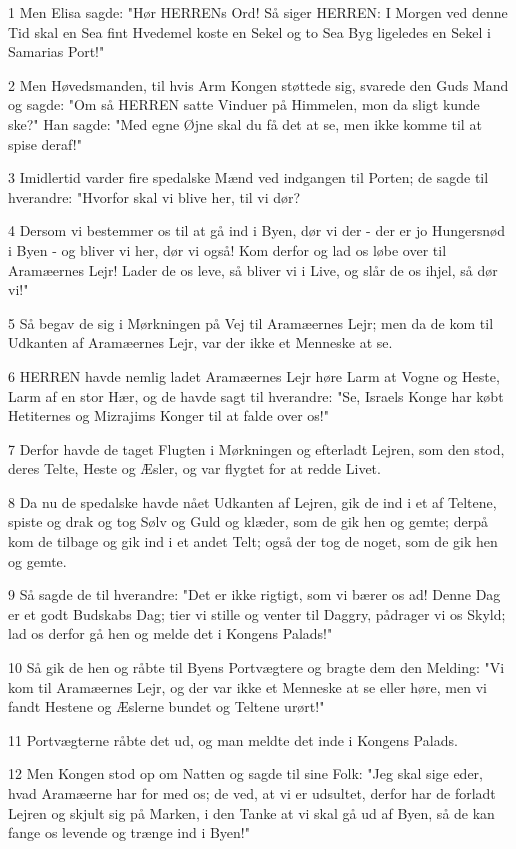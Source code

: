 \par 1 Men Elisa sagde: "Hør HERRENs Ord! Så siger HERREN: I Morgen ved denne Tid skal en Sea fint Hvedemel koste en Sekel og to Sea Byg ligeledes en Sekel i Samarias Port!"
\par 2 Men Høvedsmanden, til hvis Arm Kongen støttede sig, svarede den Guds Mand og sagde: "Om så HERREN satte Vinduer på Himmelen, mon da sligt kunde ske?" Han sagde: "Med egne Øjne skal du få det at se, men ikke komme til at spise deraf!"
\par 3 Imidlertid varder fire spedalske Mænd ved indgangen til Porten; de sagde til hverandre: "Hvorfor skal vi blive her, til vi dør?
\par 4 Dersom vi bestemmer os til at gå ind i Byen, dør vi der - der er jo Hungersnød i Byen - og bliver vi her, dør vi også! Kom derfor og lad os løbe over til Aramæernes Lejr! Lader de os leve, så bliver vi i Live, og slår de os ihjel, så dør vi!"
\par 5 Så begav de sig i Mørkningen på Vej til Aramæernes Lejr; men da de kom til Udkanten af Aramæernes Lejr, var der ikke et Menneske at se.
\par 6 HERREN havde nemlig ladet Aramæernes Lejr høre Larm at Vogne og Heste, Larm af en stor Hær, og de havde sagt til hverandre: "Se, Israels Konge har købt Hetiternes og Mizrajims Konger til at falde over os!"
\par 7 Derfor havde de taget Flugten i Mørkningen og efterladt Lejren, som den stod, deres Telte, Heste og Æsler, og var flygtet for at redde Livet.
\par 8 Da nu de spedalske havde nået Udkanten af Lejren, gik de ind i et af Teltene, spiste og drak og tog Sølv og Guld og klæder, som de gik hen og gemte; derpå kom de tilbage og gik ind i et andet Telt; også der tog de noget, som de gik hen og gemte.
\par 9 Så sagde de til hverandre: "Det er ikke rigtigt, som vi bærer os ad! Denne Dag er et godt Budskabs Dag; tier vi stille og venter til Daggry, pådrager vi os Skyld; lad os derfor gå hen og melde det i Kongens Palads!"
\par 10 Så gik de hen og råbte til Byens Portvægtere og bragte dem den Melding: "Vi kom til Aramæernes Lejr, og der var ikke et Menneske at se eller høre, men vi fandt Hestene og Æslerne bundet og Teltene urørt!"
\par 11 Portvægterne råbte det ud, og man meldte det inde i Kongens Palads.
\par 12 Men Kongen stod op om Natten og sagde til sine Folk: "Jeg skal sige eder, hvad Aramæerne har for med os; de ved, at vi er udsultet, derfor har de forladt Lejren og skjult sig på Marken, i den Tanke at vi skal gå ud af Byen, så de kan fange os levende og trænge ind i Byen!"
